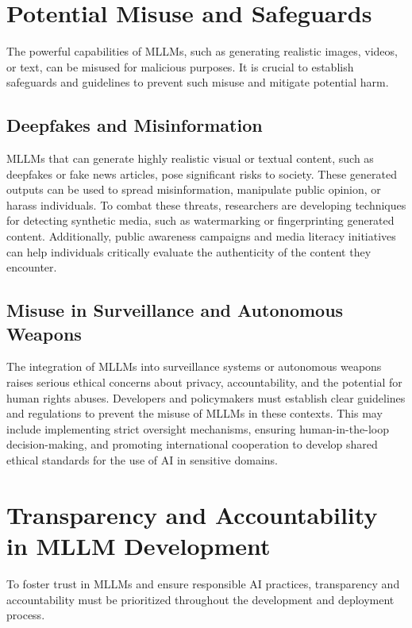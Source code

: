 \section{Potential Misuse and Safeguards}

The powerful capabilities of MLLMs, such as generating realistic images, videos, or text, can be misused for malicious purposes. It is crucial to establish safeguards and guidelines to prevent such misuse and mitigate potential harm.

\subsection{Deepfakes and Misinformation}

MLLMs that can generate highly realistic visual or textual content, such as deepfakes or fake news articles, pose significant risks to society. These generated outputs can be used to spread misinformation, manipulate public opinion, or harass individuals. To combat these threats, researchers are developing techniques for detecting synthetic media, such as watermarking or fingerprinting generated content. Additionally, public awareness campaigns and media literacy initiatives can help individuals critically evaluate the authenticity of the content they encounter.

\subsection{Misuse in Surveillance and Autonomous Weapons}

The integration of MLLMs into surveillance systems or autonomous weapons raises serious ethical concerns about privacy, accountability, and the potential for human rights abuses. Developers and policymakers must establish clear guidelines and regulations to prevent the misuse of MLLMs in these contexts. This may include implementing strict oversight mechanisms, ensuring human-in-the-loop decision-making, and promoting international cooperation to develop shared ethical standards for the use of AI in sensitive domains.

\section{Transparency and Accountability in MLLM Development}

To foster trust in MLLMs and ensure responsible AI practices, transparency and accountability must be prioritized throughout the development and deployment process.

